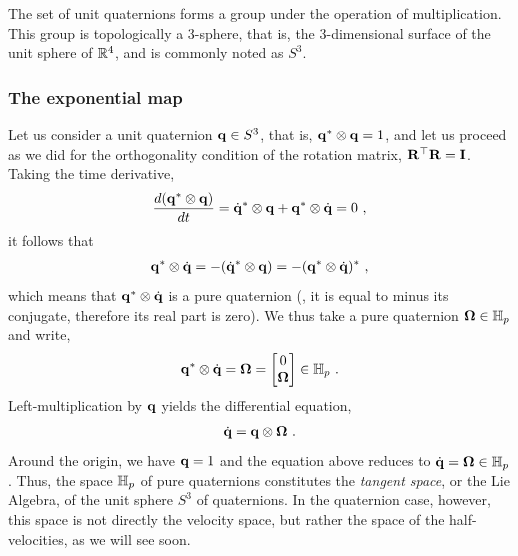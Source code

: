 The set of unit quaternions forms a group under the operation of multiplication. This group is topologically a 3-sphere, that is, the 3-dimensional surface of the unit sphere of ${\mathbb R}^4$, and is commonly noted as $S^3$. 

\subsubsection{The exponential map}

Let us consider a unit quaternion ${\bf q}\in S^3$, that is, ${\bf q}^*\otimes{\bf q}=1$, and let us proceed as we did for the orthogonality condition of the rotation matrix, ${\bf R}^{\top}{\bf R}={\bf I}$. 
Taking the time derivative,
%
\begin{align}
\frac{d({\bf q}^*\otimes{\bf q})}{dt} = \dot{{\bf q}}^*\otimes{\bf q}+{\bf q}^*\otimes\dot{{\bf q}}=0
~,
\end{align}
%
it follows that
%
\begin{align}
{\bf q}^*\otimes\dot{{\bf q}} = -(\dot{{\bf q}}^*\otimes{\bf q}) = -({\bf q}^*\otimes\dot{{\bf q}})^*~,
\end{align}
%
which means that ${\bf q}^*\otimes\dot{{\bf q}}$ is a pure quaternion (\ie, it is equal to minus its conjugate, therefore its real part is zero). 
We thus take a pure quaternion ${\bm \Omega}\in{\mathbb H}_p$ and write,
%
\begin{align}
{\bf q}^*\otimes\dot{{\bf q}} = {\bm \Omega} = \begin{bmatrix}
0\\{\bm \Omega}
\end{bmatrix} 
\in{\mathbb H}_p
~.
\end{align}
%
Left-multiplication by ${\bf q}$ yields the differential equation,
%
\begin{align}
\label{equ:qdotOmega}
\dot{{\bf q}} = {\bf q}\otimes{\bm \Omega}~.
\end{align}
% 
Around the origin, we have ${\bf q}=1$ and the equation above reduces to $\dot{{\bf q}}={\bm \Omega}\in{\mathbb H}_p$. 
Thus, the space ${\mathbb H}_p$ of pure quaternions constitutes the \emph{tangent space}, or the Lie Algebra, of the unit sphere $S^3$ of quaternions. 
In the quaternion case, however, this space is not directly the velocity space, but rather the space of the half-velocities, as we will see soon.


